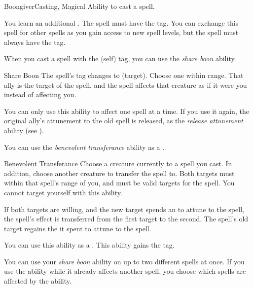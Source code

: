     \begin{feat}{Boongiver}{Casting, Magical}
        \featpre Ability to cast a spell.

         You learn an additional .
        The spell must have the  tag.
        You can exchange this spell for other spells as you gain access to new spell levels, but the spell must always have the  tag.

         When you cast a spell with the  (self) tag, you can use the \textit{share boon} ability.
        \begin{freeability}{Share Boon}
            The spell's  tag changes to  (target).
            Choose one  within \rngclose range.
            That ally is the target of the spell, and the spell affects that creature as if it were you instead of affecting you.

            You can only use this ability to affect one spell at a time.
            If you use it again, the original ally's attunement to the old spell is released, as the \textit{release attunement} ability (see ).
        \end{freeability}

         You can use the \textit{benevolent transferance} ability as a .
        \begin{freeability}{Benevolent Transferance}
            Choose a creature currently  to a spell you cast.
            In addition, choose another creature to transfer the spell to.
            Both targets must within that spell's range of you, and must be valid targets for the spell.
            You cannot target yourself with this ability.

            If both targets are willing, and the new target spends an  to attune to the spell, the spell's effect is transferred from the first target to the second.
            The spell's old target regains the  it spent to attune to the spell.

            \rankline
             You can use this ability as a .
             This ability gains the  tag.
        \end{freeability}

         You can use your \textit{share boon} ability on up to two different spells at once.
        If you use the ability while it already affects another spell, you choose which spells are affected by the ability.


\end{feat}
